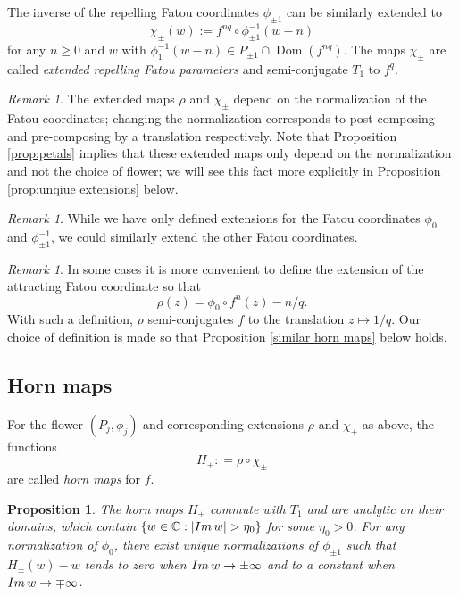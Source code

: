 \documentclass[12pt,letterpaper]{amsart}
\numberwithin{equation}{section}
\newtheorem{proposition}[equation]{Proposition}
\theoremstyle{remark}
\newtheorem{remark}[equation]{Remark}
\theoremstyle{definition}
\DeclareMathOperator{\Dom}{Dom}
\begin{document}
	The inverse of the repelling Fatou coordinates $\phi_{\pm 1}$ can be similarly extended to
	$$\chi_\pm(w) := f^{nq}\circ \phi_{\pm 1}^{-1}(w-n)$$
	for any $n\geq 0$ and $w$ with  $\phi_1^{-1}(w-n)\in P_{\pm 1}\cap \Dom(f^{nq})$.
	The maps $\chi_\pm$ are called \textit{extended repelling Fatou parameters} and semi-conjugate $T_1$ to $f^q$.
	
	
	\begin{remark}
		The extended maps $\rho$ and $\chi_\pm$ depend on the normalization of the Fatou coordinates; changing the normalization corresponds to post-composing and pre-composing by a translation respectively. 
		Note that Proposition \ref{prop:petals} implies that these extended maps only depend on the normalization and not the choice of flower; we will see this fact more explicitly in Proposition \ref{prop:unqiue extensions} below.   
	\end{remark}
	
	\begin{remark}
		While we have only defined extensions for the Fatou coordinates $\phi_0$ and $\phi_{\pm 1}^{-1}$, we could similarly extend the other Fatou coordinates.
	\end{remark}
	
	\begin{remark}
		In some cases it is more convenient to define the extension of the attracting Fatou coordinate so that $$\rho(z) = \phi_0\circ f^n(z)-n/q.$$ 
		With such a definition, $\rho$ semi-conjugates $f$ to the translation $z\mapsto 1/q$. 
		 Our choice of definition is made so that 
		Proposition \ref{similar horn maps} below holds.
	\end{remark} 
	
	
	
	
	\subsection{Horn maps}
	
	For the flower $(P_j, \phi_j)$ and corresponding extensions $\rho$ and $\chi_\pm$ as above,  the functions
	$$H_{\pm} : = \rho\circ \chi_{\pm}$$
	are called \textit{horn maps} for $f$.
	\begin{proposition}\label{horn map parabolic}
		The horn maps $H_{\pm}$ commute with $T_1$ and are analytic on their domains, which contain $\{w\in \mathbb{C}: |\emph{Im}\,w|> \eta_0\}$ for some $\eta_0>0$. 
		For any normalization of $\phi_0$, there exist unique normalizations of $\phi_{\pm 1}$  such that 
		$H_{\pm}(w) -w$ tends to zero when  $\emph{Im}\, w\to \pm \infty$ and to a constant when $\emph{Im}\,w\to \mp\infty$.
	\end{proposition}
	
\end{document}
